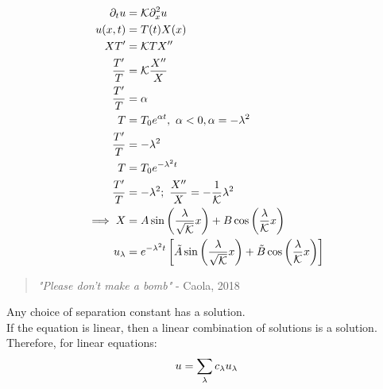 \documentclass[Maths.tex]{subfiles}
\begin{document}
\begin{example}[Diffusion in 1D]
\begin{align}
	\partial_tu &= \mathcal{K}\partial_x^2u \\
	u(x,t) &= T(t)X(x) \\
	XT' &= \mathcal{K} TX'' \\
	\frac{T'}{T} &= \mathcal{K}\frac{X''}{X} \\
	\frac{T'}{T} &= \alpha \\
	T &= T_0e^{\alpha t},~ \alpha < 0, \alpha = -\lambda^2 \\
	\frac{T'}{T} &= -\lambda^2 \\
	T &= T_0e^{-\lambda^2 t} \\
	\frac{T'}{T} &= -\lambda^2;~ \frac{X''}{X} = -\frac{1}{\mathcal{K}}\lambda^2 \\
	\implies X &= A\sin\left(\frac{\lambda}{\sqrt{\mathcal{K}}}x\right) + B\cos\left(\frac{\lambda}{\mathcal{K}}x\right) \\
	u_\lambda &= e^{-\lambda^2t} \left[\tilde{A}\sin\left(\frac{\lambda}{\sqrt{\mathcal{K}}}x\right) + \tilde{B}\cos\left(\frac{\lambda}{\mathcal{K}}x\right)\right]
\end{align}
\begin{quote}
 \textit{"Please don't make a bomb"} - Caola, 2018
\end{quote}
\end{example}

Any choice of separation constant has a solution. \\
If the equation is linear, then a linear combination of solutions is a solution.
Therefore, for linear equations:
\begin{equation}
	u = \sum_{\lambda} c_\lambda u_\lambda
\end{equation}
\end{document}
